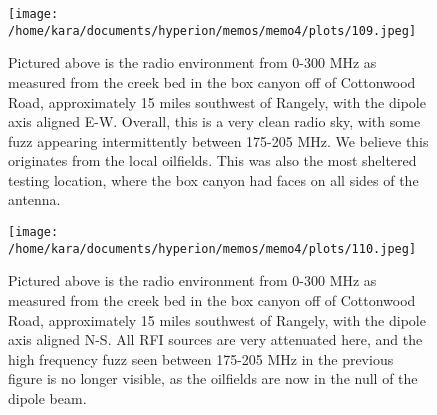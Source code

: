 \documentclass[11pt]{article}
\begin{document}
\begin{figure}[H]
    \begin{center}
    \texttt{[image: /home/kara/documents/hyperion/memos/memo4/plots/109.jpeg]}
    \end{center}
    \caption{
        Pictured above is the radio environment from 0-300 MHz as measured from 
        the creek bed in the box canyon off of Cottonwood Road, approximately 
        15 miles southwest of Rangely, with the dipole axis aligned E-W.  
           Overall, this is a very clean radio sky, with some fuzz appearing 
           intermittently between 175-205 MHz. We believe this originates from 
           the local oilfields. This was also the most sheltered testing 
           location, where the box canyon had faces on all sides of the 
           antenna.
    }
    \label{fig:109}
\end{figure}

\begin{figure}[H]
    \begin{center}
    \texttt{[image: /home/kara/documents/hyperion/memos/memo4/plots/110.jpeg]}
    \end{center}
    \caption{
        Pictured above is the radio environment from 0-300 MHz as measured from 
        the creek bed in the box canyon off of Cottonwood Road, approximately 
        15 miles southwest of Rangely, with the dipole axis aligned N-S. All 
           RFI sources are very attenuated here, and the high frequency fuzz 
           seen between 175-205 MHz in the previous figure is no longer 
           visible, as the oilfields are now in the null of the dipole beam.
    }
    \label{fig:110}
\end{figure}
\end{document}
